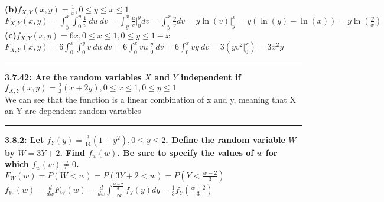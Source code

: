 \documentclass[11pt]{article}
\newcommand\question[2]{\vspace{.25in}\hrule\textbf{#1: #2}\vspace{.5em}\vspace{.10in}}
\renewcommand\part[1]{\vspace{.10in}\textbf{(#1)}}
\begin{document}
\part{b}{$f_{X,Y}(x,y) = \frac{1}{x},0 \leq y \leq x \leq 1$}
\\
$
F_{X,Y}(x,y)
=
\int_{y}^{x} \int_{0}^{y} \frac{1}{v} \ du \ dv
=
\int_{y}^{x} \frac{u}{v} \big |_{0}^{y} dv
=
\int_{y}^{x} \frac{y}{v} dv
=
y \ln (v) \big |_{y}^{x}
=
y(\ln (y) - \ln (x))
=
y \ln (\frac{y}{x})
$
\\
\part{c}{$f_{X,Y}(x,y) = 6x,0 \leq x \leq 1,0 \leq y \leq 1-x$}
\\
$
F_{X,Y}(x,y)
=
6 \int_{0}^{x} \int_{0}^{y} v \ du \ dv
=
6 \int_{0}^{x} vu \big |_{0}^{y}  \ dv
=
6 \int_{0}^{x} vy \ dv
=
3 (y v^{2} \big |_{0}^{x})
=
3x^{2}y
$


\question{3.7.42}
{Are the random variables $X$ and $Y$ independent if
$f_{X,Y}(x,y) = \frac{2}{3}(x+2y),0 \leq x \leq 1,0 \leq y \leq 1$
}
\\
We can see that the function is a linear combination of x and y, meaning that X an Y are dependent random variables

\question{3.8.2}
{Let $f_{Y}(y) = \frac{3}{14}(1+y^{2}),0 \leq y \leq 2$. Define the random
variable $W$ by $W=3Y + 2$. Find $f_{w}(w)$. Be sure to specify the values
of $w$ for which $f_{w}(w) \neq  0$.}
\\
$
F_{W}(w)
=
P(W < w)
=
P(3Y+2 < w)
=
P(Y < \frac{w-2}{3})
$
\\
$
f_{W}(w)
=
\frac{d}{dw}F_{W}(w)
=
\frac{d}{dw} \int_{- \infty}^{\frac{w-2}{3}} f_{Y}(y) dy
=
\frac{1}{3} f_{Y}(\frac{w-2}{3})
$


% 
% 
% 
% 
\end{document}
